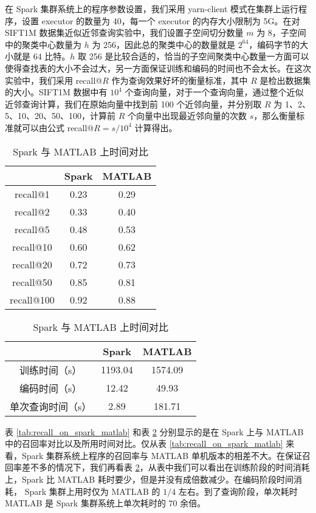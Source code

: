 在 Spark 集群系统上的程序参数设置，我们采用 yarn-client 模式在集群上运行程序，设置 executor 的数量为 40，每一个 executor 的内存大小限制为 5G。在对 SIFT1M 数据集近似近邻查询实验中，我们设置子空间切分数量 $m$ 为 8，子空间中的聚类中心数量为 $h$ 为 256，因此总的聚类中心的数量就是 $2^64$，编码字节的大小就是 64 比特。$h$ 取 256 是比较合适的，恰当的子空间聚类中心数量一方面可以使得查找表的大小不会过大，另一方面保证训练和编码的时间也不会太长。在这次实验中，我们采用 recall@$R$ 作为查询效果好坏的衡量标准，其中 $R$ 是检出数据集的大小。SIFT1M 数据中有 $10^4$ 个查询向量，对于一个查询向量，通过整个近似近邻查询计算，我们在原始向量中找到前 100 个近邻向量，并分别取 $R$ 为 1、2、5、10、20、50、100，计算前 $R$ 个向量中出现最近邻向量的次数 $s$，那么衡量标准就可以由公式 recall@$R = s/10^4$ 计算得出。
\begin{table}[htbp]
\noindent\begin{minipage}{0.5\textwidth}
\centering
\caption{Spark 与 MATLAB 上召回率对比}
\label{tab:recall_on_spark_matlab}
\begin{tabular}{ccc}
\toprule[1.5pt]
    & Spark & MATLAB\\
  \hline
  recall@1  &  0.23   & 0.29\\
  recall@2  &  0.33 &   0.40\\
  recall@5  &  0.48 &   0.53\\
  recall@10  & 0.60 &   0.62\\
  recall@20  &  0.72&  0.73\\
  recall@50  &  0.85 &  0.81\\
  recall@100  & 0.92 &  0.88\\
\bottomrule[1.5pt]
    \end{tabular}
\end{minipage}
\begin{minipage}{0.5\textwidth}
\centering
\caption{Spark 与 MATLAB 上时间对比}
\label{tab:time_on_spark_matlab}
\begin{tabular}{ccc}
\toprule[1.5pt]
    & Spark & MATLAB \\
\hline
训练时间（s） & 1193.04 & 1574.09  \\
编码时间（s） & 12.42 & 49.93 \\
单次查询时间（s）& 2.89 & 181.71 \\
\bottomrule[1.5pt]
\end{tabular}
\end{minipage}
\end{table}
表 \ref{tab:recall_on_spark_matlab} 和表 \ref{tab:time_on_spark_matlab} 分别显示的是在 Spark 上与 MATLAB 中的召回率对比以及所用时间对比。仅从表 \ref{tab:recall_on_spark_matlab} 来看，Spark 集群系统上程序的召回率与 MATLAB 单机版本的相差不大。在保证召回率差不多的情况下，我们再看表  \ref{tab:time_on_spark_matlab}，从表中我们可以看出在训练阶段的时间消耗上，Spark 比 MATLAB 耗时要少，但是并没有成倍数减少。在编码阶段时间消耗， Spark 集群上用时仅为 MATLAB 的 $1/4$ 左右。到了查询阶段，单次耗时 MATLAB 是 Spark 集群系统上单次耗时的 $70$ 余倍。
